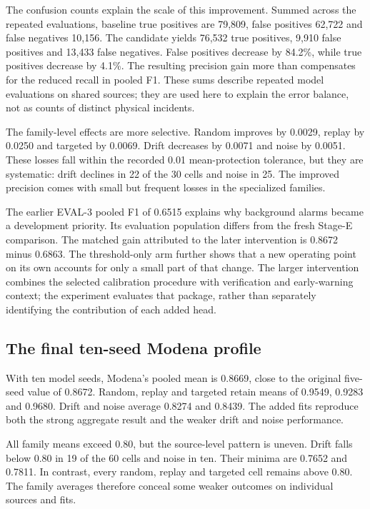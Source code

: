 

The confusion counts explain the scale of this improvement. Summed across the repeated evaluations, baseline true positives are 79,809, false positives 62,722 and false negatives 10,156. The candidate yields 76,532 true positives, 9,910 false positives and 13,433 false negatives. False positives decrease by 84.2\%, while true positives decrease by 4.1\%. The resulting precision gain more than compensates for the reduced recall in pooled F1. These sums describe repeated model evaluations on shared sources; they are used here to explain the error balance, not as counts of distinct physical incidents.

The family-level effects are more selective. Random improves by 0.0029, replay by 0.0250 and targeted by 0.0069. Drift decreases by 0.0071 and noise by 0.0051. These losses fall within the recorded 0.01 mean-protection tolerance, but they are systematic: drift declines in 22 of the 30 cells and noise in 25. The improved precision comes with small but frequent losses in the specialized families.

The earlier EVAL-3 pooled F1 of 0.6515 explains why background alarms became a development priority. Its evaluation population differs from the fresh Stage-E comparison. The matched gain attributed to the later intervention is 0.8672 minus 0.6863. The threshold-only arm further shows that a new operating point on its own accounts for only a small part of that change. The larger intervention combines the selected calibration procedure with verification and early-warning context; the experiment evaluates that package, rather than separately identifying the contribution of each added head.

\subsection{The final ten-seed Modena profile}
With ten model seeds, Modena's pooled mean is 0.8669, close to the original five-seed value of 0.8672. Random, replay and targeted retain means of 0.9549, 0.9283 and 0.9680. Drift and noise average 0.8274 and 0.8439. The added fits reproduce both the strong aggregate result and the weaker drift and noise performance.

All family means exceed 0.80, but the source-level pattern is uneven. Drift falls below 0.80 in 19 of the 60 cells and noise in ten. Their minima are 0.7652 and 0.7811. In contrast, every random, replay and targeted cell remains above 0.80. The family averages therefore conceal some weaker outcomes on individual sources and fits.

